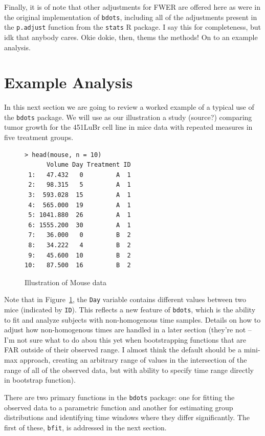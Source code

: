 \documentclass{article}
\newcommand{\xt}{\texttt}%
\begin{document}
Finally, it is of note that other adjustments for FWER are offered here as were in the original implementation of \xt{bdots}, including all of the adjustments present in the \xt{p.adjust} function from the \xt{stats} R package. I say this for completeness, but idk that anybody cares. Okie dokie, then, thems the methods! On to an example analysis.


\section{Example Analysis}

In this next section we are going to review a worked example of a typical use of the \xt{bdots} package. We will use as our illustration a study (source?) comparing tumor growth for the 451LuBr cell line in mice data with repeated measures in five treatment groups.

\begin{singlespace}
\begin{figure}
\centering
\begin{BVerbatim}
> head(mouse, n = 10)
      Volume Day Treatment ID
 1:   47.432   0         A  1
 2:   98.315   5         A  1
 3:  593.028  15         A  1
 4:  565.000  19         A  1
 5: 1041.880  26         A  1
 6: 1555.200  30         A  1
 7:   36.000   0         B  2
 8:   34.222   4         B  2
 9:   45.600  10         B  2
10:   87.500  16         B  2
\end{BVerbatim}
\caption{Illustration of Mouse data}
\label{fig:mouse_head}
\end{figure}
\end{singlespace}

Note that in Figure~\ref{fig:mouse_head}, the \xt{Day} variable contains different values between two mice (indicated by \xt{ID}). This reflects a new feature of \xt{bdots}, which is the ability to fit and analyze subjects with non-homogenous time samples. Details on how to adjust how non-homogenous times are handled in a later section (they're not -- I'm not sure what to do abou this yet when bootstrapping functions that are FAR outside of their observed range. I almost think the default should be a mini-max approach, creating an arbitrary range of values in the intersection of the range of all of the observed data, but with ability to specify time range directly in bootstrap function).

There are two primary functions in the \xt{bdots} package: one for fitting the observed data to a parametric function and another for estimating group distributions and identifying time windows where they differ significantly. The first of these, \xt{bfit}, is addressed in the next section.
\end{document}
